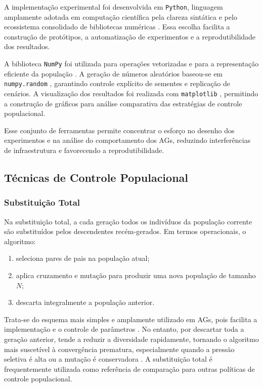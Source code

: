 A implementação experimental foi desenvolvida em \texttt{Python}, linguagem amplamente adotada em computação científica pela clareza sintática e pelo ecossistema consolidado de bibliotecas numéricas \cite{python3reference}. Essa escolha facilita a construção de protótipos, a automatização de experimentos e a reprodutibilidade dos resultados.

A biblioteca \texttt{NumPy} foi utilizada para operações vetorizadas e para a representação eficiente da população \cite{harris2020array}. A geração de números aleatórios baseou-se em \texttt{numpy.random} \cite{python3random}, garantindo controle explícito de sementes e replicação de cenários. A visualização dos resultados foi realizada com \texttt{matplotlib} \cite{hunter2007matplotlib}, permitindo a construção de gráficos para análise comparativa das estratégias de controle populacional.

Esse conjunto de ferramentas permite concentrar o esforço no desenho dos experimentos e na análise do comportamento dos AGs, reduzindo interferências de infraestrutura e favorecendo a reprodutibilidade.

\subsection{Técnicas de Controle Populacional}
\label{sec:controlepopulacional}

\subsubsection{Substituição Total}

Na substituição total, a cada geração todos os indivíduos da população corrente são substituídos pelos descendentes recém-gerados. Em termos operacionais, o algoritmo:

\begin{enumerate}
    \item seleciona pares de pais na população atual;
    \item aplica cruzamento e mutação para produzir uma nova população de tamanho $N$;
    \item descarta integralmente a população anterior.
\end{enumerate}

Trata-se do esquema mais simples e amplamente utilizado em AGs, pois facilita a implementação e o controle de parâmetros \cite{goldberg1989genetic,whitley1994tutorial}. No entanto, por descartar toda a geração anterior, tende a reduzir a diversidade rapidamente, tornando o algoritmo mais suscetível à convergência prematura, especialmente quando a pressão seletiva é alta ou a mutação é conservadora \cite{dejong1975analysis,spears1993crossover}. A substituição total é frequentemente utilizada como referência de comparação para outras políticas de controle populacional.

